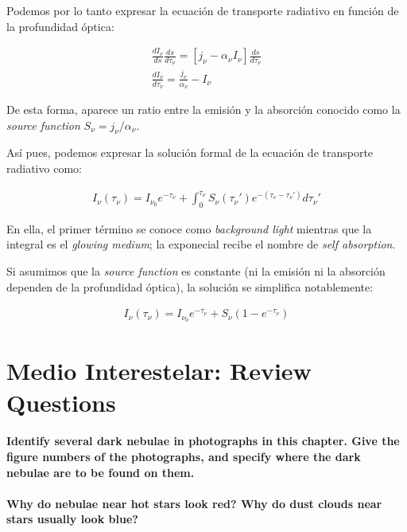 \documentclass{tufte-handout}
\begin{document}
Podemos por lo tanto expresar la ecuación de transporte radiativo en función de la profundidad óptica:

\begin{align}
  \frac{dI_\nu}{ds}\frac{ds}{d\tau_\nu} = [j_\nu - \alpha_\nu I_\nu]\frac{ds}{d\tau_\nu}\\
  \frac{dI_\nu}{d\tau_\nu} = \frac{j_\nu}{\alpha_\nu} - I_\nu
\end{align}

De esta forma, aparece un ratio entre la emisión y la absorción conocido como la \emph{source function} $ S_\nu = j_\nu / \alpha_\nu$.

Así pues, podemos expresar la solución formal de la ecuación de transporte radiativo como:

\begin{align}
I_\nu(\tau_\nu) = I_{\nu_0}e^{-\tau_\nu} + \int_0^{\tau_\nu} S_\nu(\tau_\nu')e^{-(\tau_\nu - \tau_\nu')}d\tau_\nu'
\end{align}

En ella, el primer término se conoce como \emph{background light} mientras que la integral es el \emph{glowing medium}; la exponecial recibe el nombre de \emph{self absorption}.

Si asumimos que la \emph{source function} es constante (ni la emisión ni la absorción dependen de la profundidad óptica), la solución se simplifica notablemente:

\begin{align}
I_\nu(\tau_\nu) = I_{\nu_0}e^{-\tau_\nu} + S_\nu (1-e^{-\tau_\nu})
\end{align}

\section{Medio Interestelar: Review Questions}

\paragraph{Identify several dark nebulae in photographs in this chapter. Give the figure numbers of the photographs,
and specify where the dark nebulae are to be found on them.}

\paragraph{\textbf{Why do nebulae near hot stars look red? Why do dust clouds near stars usually look blue?}}
\end{document}
